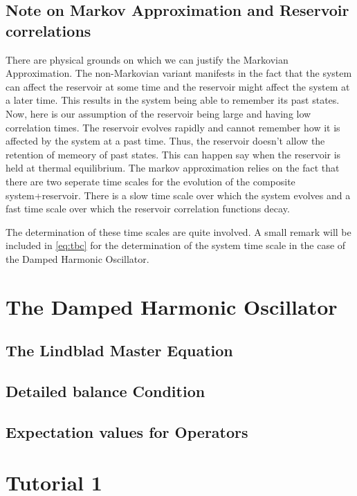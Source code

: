 \documentclass{scrartcl}
\newcommand{\1}{\mathbbm{1}}
\begin{document}
\subsection{Note on Markov Approximation and Reservoir correlations}
There are physical grounds on which we can justify the Markovian Approximation. The non-Markovian variant manifests in the 
fact that the system can affect the reservoir at some time and the reservoir might affect the system at a later time. This
results in the system being able to remember its past states. Now, here is our assumption of the reservoir being large and having low
correlation times. The reservoir evolves rapidly and cannot remember how it is affected by the system at a past time. Thus, 
the reservoir doesn't allow the retention of memeory of past states. This can happen say when the reservoir
is held at thermal equilibrium. The markov approximation relies on the fact that there are two seperate time scales for the evolution of the composite 
system+reservoir. There is a slow time scale over which the system evolves and a fast time scale over which the reservoir correlation functions decay.

The determination of these time scales are quite involved. A small remark will be included in \cref{eq:tbc} for the determination of the system 
time scale in the case of the Damped Harmonic Oscillator.


\section{The Damped Harmonic Oscillator}
\subsection{The Lindblad Master Equation}
\subsection{Detailed balance Condition}
\subsection{Expectation values for Operators}
\section{Tutorial 1}
\end{document}
